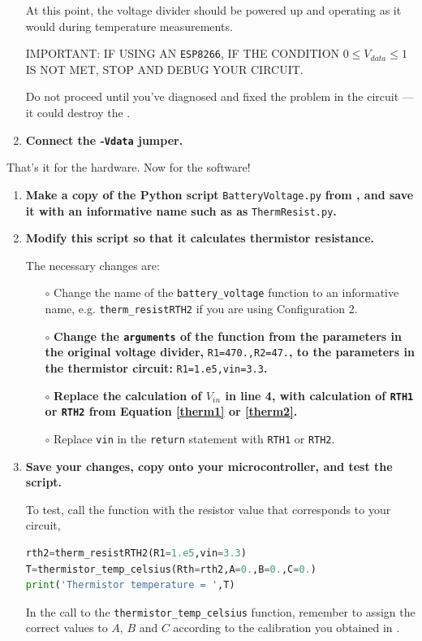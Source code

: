 \begin{enumerate}
	At this point, the voltage divider should be powered up and operating as it would during temperature measurements.

	\smallskip
	IMPORTANT: IF USING AN \texttt{ESP8266}, IF THE CONDITION $0 \le V_{data} \le 1$ IS NOT MET, STOP AND DEBUG YOUR CIRCUIT.

	\smallskip
	Do not proceed until you've diagnosed and fixed the problem in the circuit --- it could destroy the \adc.

	\item \textbf{Connect the \adc-\texttt{Vdata} jumper.}

\end{enumerate}
That's it for the hardware.
Now for the software!

\begin{enumerate}[resume]
	\item \textbf{Make a copy of the Python script }\lstinline{BatteryVoltage.py} \textbf{from , and save it with an informative name such as as }\lstinline{ThermResist.py}\textbf{.}

	\item \textbf{Modify this script so that it calculates thermistor resistance.}

	The necessary changes are:
	\begin{itemize}
		\item[$\circ$] Change the name of the \lstinline{battery_voltage} function to an informative name, e.g. \lstinline{therm_resistRTH2} if you are using Configuration 2.

		\item[$\circ$] \textbf{Change the \texttt{arguments} of the function from the parameters in the original voltage divider,} \lstinline{R1=470.,R2=47.}\textbf{, to the parameters in the thermistor circuit:} \lstinline{R1=1.e5,vin=3.3}\textbf{.}

		\item[$\circ$] \textbf{Replace the calculation of $V_{in}$ in line 4, with calculation of \texttt{RTH1} or \texttt{RTH2} from Equation \ref{therm1} or \ref{therm2}.}

		\item[$\circ$] Replace \texttt{vin} in the \texttt{return} statement with \texttt{RTH1} or \texttt{RTH2}.
	\end{itemize}

	\item \textbf{Save your changes, copy onto your microcontroller, and test the script.}

	To test, call the function with the resistor value that corresponds to your circuit,
\begin{lstlisting}[language=Python]
rth2=therm_resistRTH2(R1=1.e5,vin=3.3)
T=thermistor_temp_celsius(Rth=rth2,A=0.,B=0.,C=0.)
print('Thermistor temperature = ',T)
\end{lstlisting}
	In the call to the \lstinline{thermistor_temp_celsius} function, remember to assign the correct values to $A$, $B$ and $C$ according to the calibration you obtained in .


\end{enumerate}


